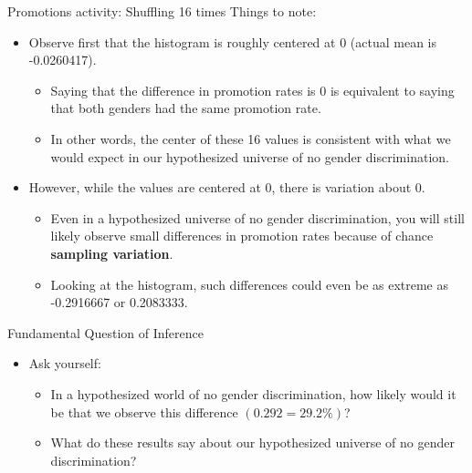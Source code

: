 \documentclass[
  ignorenonframetext,
]{beamer}
\providecommand{\tightlist}{%
  \setlength{\itemsep}{0pt}\setlength{\parskip}{0pt}}
\begin{document}
\begin{frame}{Promotions activity: Shuffling 16 times}
\label{promotions-activity-shuffling-16-times-1}
Things to note:

\begin{itemize}
\item
  Observe first that the histogram is roughly centered at 0 (actual mean
  is -0.0260417).

  \begin{itemize}
  \tightlist
  \item
    Saying that the difference in promotion rates is 0 is equivalent to
    saying that both genders had the same promotion rate.
  \item
    In other words, the center of these 16 values is consistent with
    what we would expect in our hypothesized universe of no gender
    discrimination.
  \end{itemize}
\item
  However, while the values are centered at 0, there is variation about
  0.

  \begin{itemize}
  \tightlist
  \item
    Even in a hypothesized universe of no gender discrimination, you
    will still likely observe small differences in promotion rates
    because of chance \textbf{sampling variation}.
  \item
    Looking at the histogram, such differences could even be as extreme
    as -0.2916667 or 0.2083333.
  \end{itemize}
\end{itemize}
\end{frame}

\begin{frame}{Fundamental Question of Inference}
\label{fundamental-question-of-inference-1}
\begin{itemize}
\item
  Ask yourself:

  \begin{itemize}
  \item
    In a hypothesized world of no gender discrimination, how likely
    would it be that we observe this difference \((0.292 = 29.2\%)\)?
  \item
    What do these results say about our hypothesized universe of no
    gender discrimination?
  \end{itemize}
\end{itemize}
\end{frame}
\end{document}
